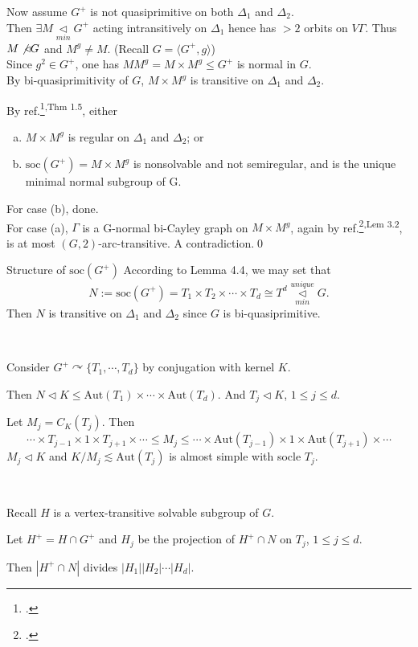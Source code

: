 \documentclass{beamer}
\def\Aut{\mathrm{Aut}}
\def\soc{\mathrm{soc}}
\begin{document}
\begin{frame}
Now assume $G^+$ is not quasiprimitive on both $\Delta_1$ and $\Delta_2$.\\ Then $\exists M\mathop{\triangleleft}\limits_{min} G^+$ acting intransitively on $\Delta_1$ hence has $> 2$ orbits on $V\Gamma$. Thus $M\not\triangleleft G$ and $M^g\neq M$. (Recall $G=\langle G^+,g\rangle$)\\Since $g^2\in G^+$, one has $MM^g=M\times M^g\leq G^+$ is normal in $G$.\\By bi-quasiprimitivity of $G$, $M\times M^g$ is transitive on $\Delta_1$ and $\Delta_2$.

By ref.\footcite{LI2002197}\textsuperscript{,Thm 1.5}, either
\begin{enumerate}[(a)]
	\item $M\times M^g$ is regular on $\Delta_1$ and $\Delta_2$; or
	\item $\soc(G^+)=M\times M^g$ is nonsolvable and not semiregular, and is the unique minimal normal subgroup of G.
\end{enumerate}
For case (b), done.\\
For case (a), $\Gamma$ is a G-normal bi-Cayley graph on $M\times M^g$, again by ref.\footcite{CONDER2020264}\textsuperscript{,Lem 3.2}, is at most $(G,2)$-arc-transitive. A contradiction.\qed 
\end{frame}



\begin{frame}{Structure of $\soc(G^+)$}
According to Lemma 4.4, we may set that
\[ N:=\soc(G^+)=T_1\times T_2\times\cdots\times T_d\cong T^d\mathop{\triangleleft}\limits_{min}^{unique} G . \]
Then $N$ is transitive on $\Delta_1$ and $\Delta_2$ since $G$ is bi-quasiprimitive.

\ 

Consider $G^+\curvearrowright \{T_1,\cdots,T_d\}$ by conjugation with kernel $K$.

Then $N\triangleleft K\leq \Aut(T_1)\times \cdots\times \Aut(T_d)$. 
And $T_j\triangleleft K$, $1\leq j\leq d$. 

Let $M_j=C_K(T_j)$. Then\[ \cdots\times T_{j-1}\times 1\times T_{j+1}\times \cdots\leq M_j\leq \cdots\times \Aut(T_{j-1})\times 1\times  \Aut(T_{j+1})\times \cdots \]
$M_j\triangleleft K$ and $K/M_j\lesssim \Aut(T_j)$ is almost simple with socle $T_j$.%

\ 

Recall $H$ is a vertex-transitive solvable subgroup of $G$. 

Let $H^+=H\cap G^+$ and $H_j$ be the projection of $H^+\cap N$ on $T_j$, $1\leq j\leq d$.

Then $|H^+\cap N|$ divides $|H_1||H_2|\cdots|H_d|$.

\end{frame}
\end{document}
